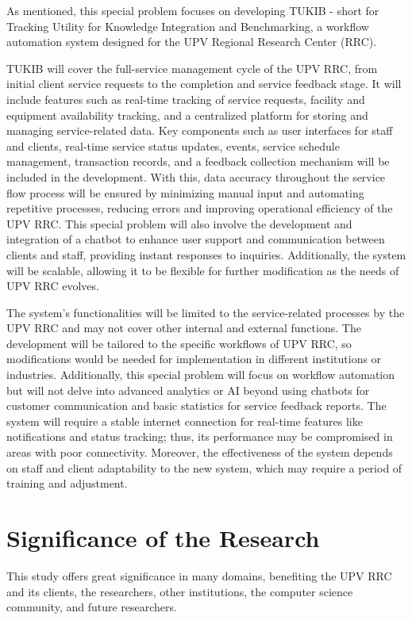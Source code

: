 As mentioned, this special problem focuses on developing TUKIB - short for Tracking Utility for Knowledge Integration and Benchmarking, a workflow automation system designed for the UPV Regional Research Center (RRC). 

TUKIB will cover the full-service management cycle of the UPV RRC, from initial client service requests to the completion and service feedback stage. It will include features such as real-time tracking of service requests, facility and equipment availability tracking, and a centralized platform for storing and managing service-related data. Key components such as user interfaces for staff and clients, real-time service status updates, events, service schedule management, transaction records, and a feedback collection mechanism will be included in the development. With this, data accuracy throughout the service flow process will be ensured by minimizing manual input and automating repetitive processes, reducing errors and improving operational efficiency of the UPV RRC. This special problem will also involve the development and integration of a chatbot to enhance user support and communication between clients and staff, providing instant responses to inquiries. Additionally, the system will be scalable, allowing it to be flexible for further modification as the needs of UPV RRC evolves.

The system’s functionalities will be limited to the service-related processes by the UPV RRC and may not cover other internal and external functions. The development will be tailored to the specific workflows of UPV RRC, so modifications would be needed for implementation in different institutions or industries. Additionally, this special problem will focus on workflow automation but will not delve into advanced analytics or AI beyond using chatbots for customer communication and basic statistics for service feedback reports. The system will require a stable internet connection for real-time features like notifications and status tracking; thus, its performance may be compromised in areas with poor connectivity. Moreover, the effectiveness of the system depends on staff and client adaptability to the new system, which may require a period of training and adjustment.


\section{Significance of the Research}
\label{sec:significance}

This study offers great significance in many domains, benefiting the UPV RRC and its clients, the researchers, other institutions, the computer science community, and future researchers.

